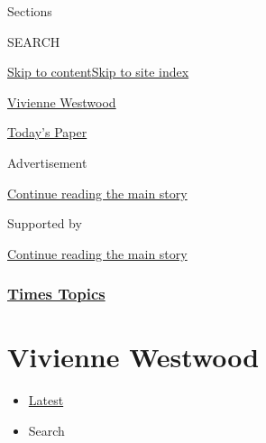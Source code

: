 Sections

SEARCH

\protect\hyperlink{site-content}{Skip to
content}\protect\hyperlink{site-index}{Skip to site index}

\href{https://www.nytimes3xbfgragh.onion/topic/person/vivienne-westwood}{Vivienne
Westwood}

\href{https://myaccount.nytimes3xbfgragh.onion/auth/login?response_type=cookie\&client_id=vi}{}

\href{https://www.nytimes3xbfgragh.onion/section/todayspaper}{Today's
Paper}

Advertisement

\protect\hyperlink{after-top}{Continue reading the main story}

Supported by

\protect\hyperlink{after-sponsor}{Continue reading the main story}

\hypertarget{times-topics}{%
\subsubsection{\texorpdfstring{\href{/index.html}{Times
Topics}}{Times Topics}}\label{times-topics}}

\hypertarget{vivienne-westwood}{%
\section{Vivienne Westwood}\label{vivienne-westwood}}

\begin{itemize}
\tightlist
\item
  \protect\hyperlink{stream-panel}{Latest}
\item
  Search
\end{itemize}

